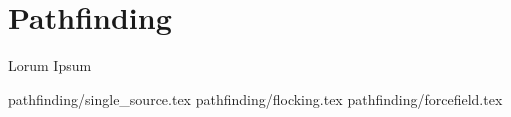 \section{Pathfinding}
Lorum Ipsum

{pathfinding/single_source.tex}
{pathfinding/flocking.tex}
{pathfinding/forcefield.tex}
